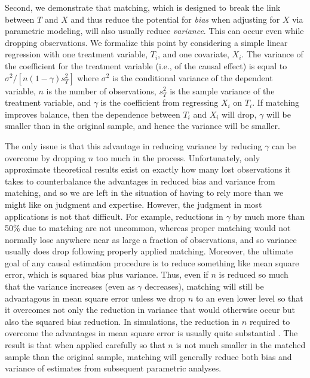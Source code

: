 \documentclass[11pt,titlepage]{article}
\begin{document}
Second, we demonstrate that matching, which is designed to break the
link between $T$ and $X$ and thus reduce the potential for \emph{bias}
when adjusting for $X$ via parametric modeling, will also usually
reduce \emph{variance}.  This can occur even while dropping
observations.  We formalize this point by considering a simple linear
regression with one treatment variable, $T_i$, and one covariate,
$X_i$.  The variance of the coefficient for the treatment variable
(i.e., of the causal effect) is equal to $\sigma^2/[n (1-\gamma)
s^2_T]$ where $\sigma^2$ is the conditional variance of the dependent
variable, $n$ is the number of observations, $s^2_T$ is the sample
variance of the treatment variable, and $\gamma$ is the coefficient
from regressing $X_i$ on $T_i$.  If matching improves balance, then
the dependence between $T_i$ and $X_i$ will drop, $\gamma$ will be
smaller than in the original sample, and hence the variance will be
smaller.  

The only issue is that this advantage in reducing variance by reducing
$\gamma$ can be overcome by dropping $n$ too much in the process.
Unfortunately, only approximate theoretical results exist on exactly
how many lost observations it takes to counterbalance the advantages
in reduced bias and variance from matching, and so we are left in the
situation of having to rely more than we might like on judgment and
expertise.  However, the judgment in most applications is not that
difficult.  For example, reductions in $\gamma$ by much more than 50\%
due to matching are not uncommon, whereas proper matching would not
normally lose anywhere near as large a fraction of observations, and
so variance usually does drop following properly applied matching.
Moreover, the ultimate goal of any causal estimation procedure is to
reduce something like mean square error, which is squared bias plus
variance.  Thus, even if $n$ is reduced so much that the variance
increases (even as $\gamma$ decreases), matching will still be
advantagous in mean square error unless we drop $n$ to an even lower
level so that it overcomes not only the reduction in variance that
would otherwise occur but also the squared bias reduction.  In
simulations, the reduction in $n$ required to overcome the advantages
in mean square error is usually quite substantial \citep{RubTho96}.
The result is that when applied carefully so that $n$ is not much
smaller in the matched sample than the original sample, matching will
generally reduce both bias and variance of estimates from subsequent
parametric analyses.
\end{document}
